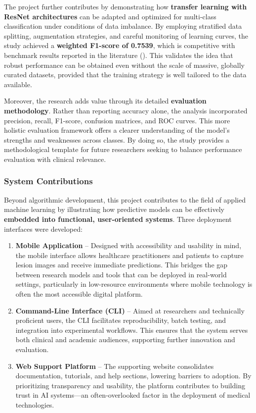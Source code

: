 \documentclass[
  12pt,
  oneside]{article}
\begin{document}
The project further contributes by demonstrating how \textbf{transfer
learning with ResNet architectures} can be adapted and optimized for
multi-class classification under conditions of data imbalance. By
employing stratified data splitting, augmentation strategies, and
careful monitoring of learning curves, the study achieved a
\textbf{weighted F1-score of 0.7539}, which is competitive with
benchmark results reported in the literature
(). This validates
the idea that robust performance can be obtained even without the scale
of massive, globally curated datasets, provided that the training
strategy is well tailored to the data available.

Moreover, the research adds value through its detailed
\textbf{evaluation methodology}. Rather than reporting accuracy alone,
the analysis incorporated precision, recall, F1-score, confusion
matrices, and ROC curves. This more holistic evaluation framework offers
a clearer understanding of the model's strengths and weaknesses across
classes. By doing so, the study provides a methodological template for
future researchers seeking to balance performance evaluation with
clinical relevance.

\subsubsection{System Contributions}\label{system-contributions}

Beyond algorithmic development, this project contributes to the field of
applied machine learning by illustrating how predictive models can be
effectively \textbf{embedded into functional, user-oriented systems}.
Three deployment interfaces were developed:

\begin{enumerate}
\def\labelenumi{\arabic{enumi}.}
\item
  \textbf{Mobile Application} -- Designed with accessibility and
  usability in mind, the mobile interface allows healthcare
  practitioners and patients to capture lesion images and receive
  immediate predictions. This bridges the gap between research models
  and tools that can be deployed in real-world settings, particularly in
  low-resource environments where mobile technology is often the most
  accessible digital platform.
\item
  \textbf{Command-Line Interface (CLI)} -- Aimed at researchers and
  technically proficient users, the CLI facilitates reproducibility,
  batch testing, and integration into experimental workflows. This
  ensures that the system serves both clinical and academic audiences,
  supporting further innovation and evaluation.
\item
  \textbf{Web Support Platform} -- The supporting website consolidates
  documentation, tutorials, and help sections, lowering barriers to
  adoption. By prioritizing transparency and usability, the platform
  contributes to building trust in AI systems---an often-overlooked
  factor in the deployment of medical technologies.
\end{enumerate}
\end{document}

